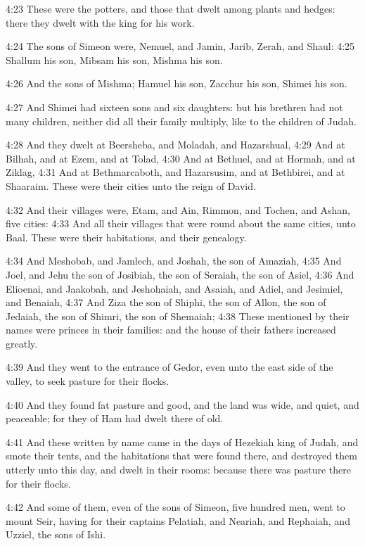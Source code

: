 4:23 These were the potters, and those that dwelt among plants and hedges: there they dwelt with the king for his work.

4:24 The sons of Simeon were, Nemuel, and Jamin, Jarib, Zerah, and Shaul: 4:25 Shallum his son, Mibsam his son, Mishma his son.

4:26 And the sons of Mishma; Hamuel his son, Zacchur his son, Shimei his son.

4:27 And Shimei had sixteen sons and six daughters: but his brethren had not many children, neither did all their family multiply, like to the children of Judah.

4:28 And they dwelt at Beersheba, and Moladah, and Hazarshual, 4:29 And at Bilhah, and at Ezem, and at Tolad, 4:30 And at Bethuel, and at Hormah, and at Ziklag, 4:31 And at Bethmarcaboth, and Hazarsusim, and at Bethbirei, and at Shaaraim. These were their cities unto the reign of David.

4:32 And their villages were, Etam, and Ain, Rimmon, and Tochen, and Ashan, five cities: 4:33 And all their villages that were round about the same cities, unto Baal. These were their habitations, and their genealogy.

4:34 And Meshobab, and Jamlech, and Joshah, the son of Amaziah, 4:35 And Joel, and Jehu the son of Josibiah, the son of Seraiah, the son of Asiel, 4:36 And Elioenai, and Jaakobah, and Jeshohaiah, and Asaiah, and Adiel, and Jesimiel, and Benaiah, 4:37 And Ziza the son of Shiphi, the son of Allon, the son of Jedaiah, the son of Shimri, the son of Shemaiah; 4:38 These mentioned by their names were princes in their families: and the house of their fathers increased greatly.

4:39 And they went to the entrance of Gedor, even unto the east side of the valley, to seek pasture for their flocks.

4:40 And they found fat pasture and good, and the land was wide, and quiet, and peaceable; for they of Ham had dwelt there of old.

4:41 And these written by name came in the days of Hezekiah king of Judah, and smote their tents, and the habitations that were found there, and destroyed them utterly unto this day, and dwelt in their rooms: because there was pasture there for their flocks.

4:42 And some of them, even of the sons of Simeon, five hundred men, went to mount Seir, having for their captains Pelatiah, and Neariah, and Rephaiah, and Uzziel, the sons of Ishi.

